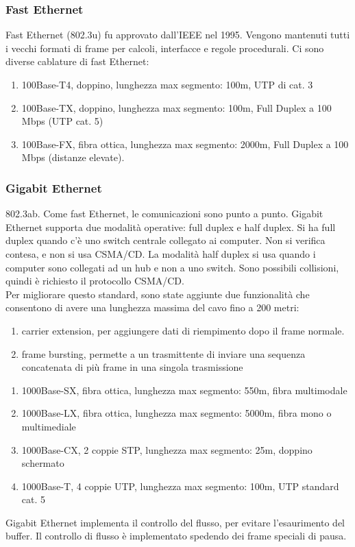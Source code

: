 \documentclass{article}
\begin{document}
{\subsubsection{Fast Ethernet}
Fast Ethernet (802.3u) fu approvato dall'IEEE nel 1995. Vengono mantenuti tutti i vecchi formati di frame per calcoli, interfacce e regole procedurali. 
Ci sono diverse cablature di fast Ethernet:
\begin{enumerate}
\item 100Base-T4, doppino, lunghezza max segmento: 100m, UTP di cat. 3
\item 100Base-TX, doppino, lunghezza max segmento: 100m, Full Duplex a 100 Mbps (UTP cat. 5)
\item 100Base-FX, fibra ottica, lunghezza max segmento: 2000m, Full Duplex a 100 Mbps (distanze elevate).	
\end{enumerate}
\subsubsection{Gigabit Ethernet}
802.3ab. Come fast Ethernet, le comunicazioni sono punto a punto. Gigabit Ethernet supporta due modalità operative: full duplex e half duplex. Si ha full duplex quando c'è uno switch centrale collegato ai computer. Non si verifica contesa, e non si usa CSMA/CD. La modalità half duplex si usa quando i computer sono collegati ad un hub e non a uno switch. Sono possibili collisioni, quindi è richiesto il protocollo CSMA/CD. \\
Per migliorare questo standard, sono state aggiunte due funzionalità che consentono di avere una lunghezza massima del cavo fino a 200 metri:
\begin{enumerate}
\item carrier extension, per aggiungere dati di riempimento dopo il frame normale.
\item frame bursting, permette a un trasmittente di inviare una sequenza concatenata di più frame in una singola trasmissione
\end{enumerate}
\begin{enumerate}
\item 1000Base-SX, fibra ottica, lunghezza max segmento: 550m, fibra multimodale
\item 1000Base-LX, fibra ottica, lunghezza max segmento: 5000m, fibra mono o multimediale
\item 1000Base-CX, 2 coppie STP, lunghezza max segmento: 25m, doppino schermato
\item 1000Base-T, 4 coppie UTP, lunghezza max segmento: 100m, UTP standard cat. 5	
\end{enumerate}
Gigabit Ethernet implementa il controllo del flusso, per evitare l'esaurimento del buffer. Il controllo di flusso è implementato spedendo dei frame speciali di pausa.
}
\end{document}
